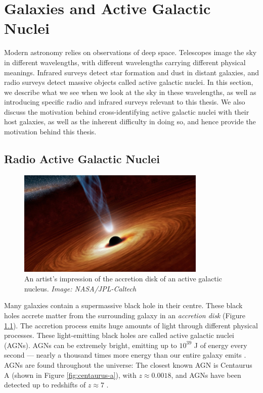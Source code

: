 \chapter{Galaxies and Active Galactic Nuclei}
\label{cha:astro}

    Modern astronomy relies on observations of deep space. Telescopes image the
    sky in different wavelengths, with different wavelengths carrying different
    physical meanings. Infrared surveys detect star formation and dust in
    distant galaxies, and radio surveys detect massive objects called active
    galactic nuclei. In this section, we describe what we see when we look at
    the sky in these wavelengths, as well as introducing specific radio and
    infrared surveys relevant to this thesis. We also discuss the motivation
    behind cross-identifying active galactic nuclei with their host galaxies, as
    well as the inherent difficulty in doing so, and hence provide the
    motivation behind this thesis.

    \section{Radio Active Galactic Nuclei}
    \label{sec:agns}

        \begin{figure}[!ht]
            \centering
            \includegraphics[width=0.8\textwidth]
                {images/accretion_disk_artist_impression.jpg}
            \caption{An artist's impression of the accretion disk of an active
                galactic nucleus. \emph{Image: NASA/JPL-Caltech}}
            \label{fig:accretion-disk}
        \end{figure}

        Many galaxies contain a supermassive black hole in their centre. These
        black holes accrete matter from the surrounding galaxy in an
        \emph{accretion disk} (Figure \ref{fig:accretion-disk}). The accretion
        process emits huge amounts of light through different physical
        processes. These light-emitting black holes are called active galactic
        nuclei (AGNs). AGNs can be extremely bright, emitting up to $10^{39}$ J
        of energy every second --- nearly a thousand times more energy than our
        entire galaxy emits \citep{begelman84}. AGNs are found throughout the
        universe: The closest known AGN is Centaurus A (shown in Figure
        \ref{fig:centaurus-a}), with $z \approx 0.0018$, and AGNs have been
        detected up to redshifts of $z \approx 7$ \citeme.

